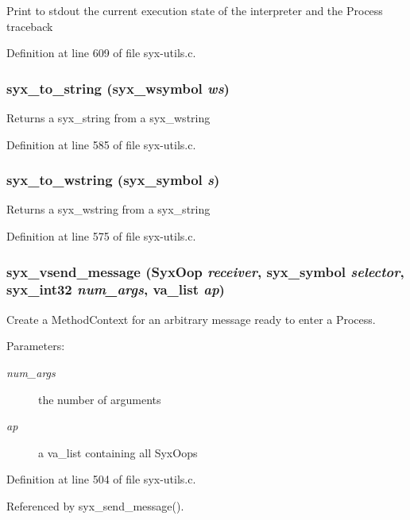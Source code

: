 Print to stdout the current execution state of the interpreter and the Process traceback 

Definition at line 609 of file syx-utils.c.\hypertarget{syx-utils_8c_1cb75f3e31fcc89edebfbf8c7adcc822}{
\subsubsection{ syx\_\-to\_\-string ({\bf syx\_\-wsymbol} {\em ws})}}
\label{syx-utils_8c_1cb75f3e31fcc89edebfbf8c7adcc822}


Returns a syx\_\-string from a syx\_\-wstring 

Definition at line 585 of file syx-utils.c.\hypertarget{syx-utils_8c_7b7039ddb05c03d77889a078649ccb2b}{
\subsubsection{ syx\_\-to\_\-wstring ({\bf syx\_\-symbol} {\em s})}}
\label{syx-utils_8c_7b7039ddb05c03d77889a078649ccb2b}


Returns a syx\_\-wstring from a syx\_\-string 

Definition at line 575 of file syx-utils.c.\hypertarget{syx-utils_8c_37be9deb681cffcf8f9301dc95e31d5e}{
\subsubsection{ syx\_\-vsend\_\-message ({\bf SyxOop} {\em receiver}, \/  {\bf syx\_\-symbol} {\em selector}, \/  {\bf syx\_\-int32} {\em num\_\-args}, \/  va\_\-list {\em ap})}}
\label{syx-utils_8c_37be9deb681cffcf8f9301dc95e31d5e}


Create a MethodContext for an arbitrary message ready to enter a Process.

\begin{Desc}
\item[Parameters:]
\begin{description}
\item[{\em num\_\-args}]the number of arguments \item[{\em ap}]a va\_\-list containing all SyxOops \end{description}
\end{Desc}


Definition at line 504 of file syx-utils.c.

Referenced by syx\_\-send\_\-message().